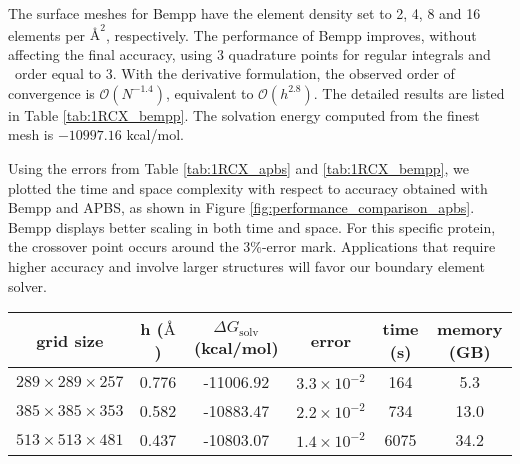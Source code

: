 The surface meshes for Bempp have the element density set to 2, 4, 8 and 16 elements per $\si{\angstrom}^{2}$, respectively.
The performance of Bempp improves, without affecting the final accuracy, using 3 quadrature points for regular integrals and \fmm\ order equal to 3.
With the derivative formulation, the observed order of convergence is $\mathcal{O}(N^{-1.4})$, equivalent to $\mathcal{O}(h^{2.8})$.
The detailed results are listed in Table \ref{tab:1RCX_bempp}.
The solvation energy computed from the finest mesh is $-10997.16$ kcal/mol.

Using the errors from Table \ref{tab:1RCX_apbs} and \ref{tab:1RCX_bempp}, we plotted the time and space complexity with respect to accuracy obtained with Bempp and APBS, as shown in Figure \ref{fig:performance_comparison_apbs}.
Bempp displays better scaling in both time and space.
For this specific protein, the crossover point occurs around the 3\%-error mark.
Applications that require higher accuracy and involve larger structures will favor our boundary element solver.

\begin{table*}[]
    \centering
    \begin{tabular}{cc|cc|cc}
    grid size                   & h ($\si{\angstrom}$) & $\Delta G_{\mathrm{solv}}$ (kcal/mol) & error               & time (s) & memory (GB) \\ \hline
    $289 \times 289 \times 257$ & 0.776                & -11006.92                             & $3.3\times 10^{-2}$ & 164      & 5.3         \\
    $385 \times 385 \times 353$ & 0.582                & -10883.47                             & $2.2\times 10^{-2}$ & 734      & 13.0        \\
    $513 \times 513 \times 481$ & 0.437                & -10803.07                             & $1.4\times 10^{-2}$ & 6075     & 34.2       
    \end{tabular}
    \caption{Results from computing the solvation energy of 1RCX using the \texttt{mg-auto} solver in APBS.
    Error is calculated based on the extrapolated solution.}
    \label{tab:1RCX_apbs}
\end{table*}

